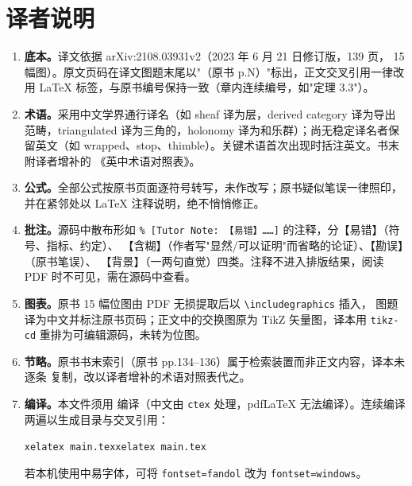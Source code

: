 \section*{译者说明}

\begin{enumerate}[leftmargin=2.2em,itemsep=0.35em]
  \item \textbf{底本。}译文依据 arXiv:2108.03931v2（2023 年 6 月 21 日修订版，139 页，
    15 幅图）。原文页码在译文图题末尾以"（原书 p.N）"标出，正文交叉引用一律改用
    \LaTeX{} 标签，与原书编号保持一致（章内连续编号，如"定理 3.3"）。
  \item \textbf{术语。}采用中文学界通行译名（如 sheaf 译为层，derived category 译为导出
    范畴，triangulated 译为三角的，holonomy 译为和乐群）；尚无稳定译名者保留英文（如
    wrapped、stop、thimble）。关键术语首次出现时括注英文。书末附译者增补的
    《英中术语对照表》。
  \item \textbf{公式。}全部公式按原书页面逐符号转写，未作改写；原书疑似笔误一律照印，
    并在紧邻处以 LaTeX 注释说明，绝不悄悄修正。
  \item \textbf{批注。}源码中散布形如
    \verb|% [Tutor Note: 【易错】……]| 的注释，分【易错】（符号、指标、约定）、
    【含糊】（作者写"显然/可以证明"而省略的论证）、【勘误】（原书笔误）、
    【背景】（一两句直觉）四类。注释不进入排版结果，阅读 PDF 时不可见，需在源码中查看。
  \item \textbf{图表。}原书 15 幅位图由 PDF 无损提取后以 \verb|\includegraphics| 插入，
    图题译为中文并标注原书页码；正文中的交换图原为 TikZ 矢量图，译本用 \verb|tikz-cd|
    重排为可编辑源码，未转为位图。
  \item \textbf{节略。}原书书末索引（原书 pp.134–136）属于检索装置而非正文内容，译本未逐条
    复制，改以译者增补的术语对照表代之。
  \item \textbf{编译。}本文件须用 \XeLaTeX{} 编译（中文由 \texttt{ctex} 处理，pdf\LaTeX{}
    无法编译）。连续编译两遍以生成目录与交叉引用：
    \begin{center}
      \texttt{xelatex main.tex}\quad\texttt{xelatex main.tex}
    \end{center}
    若本机使用中易字体，可将 \texttt{fontset=fandol} 改为 \texttt{fontset=windows}。
\end{enumerate}

\clearpage
\tableofcontents
\clearpage

